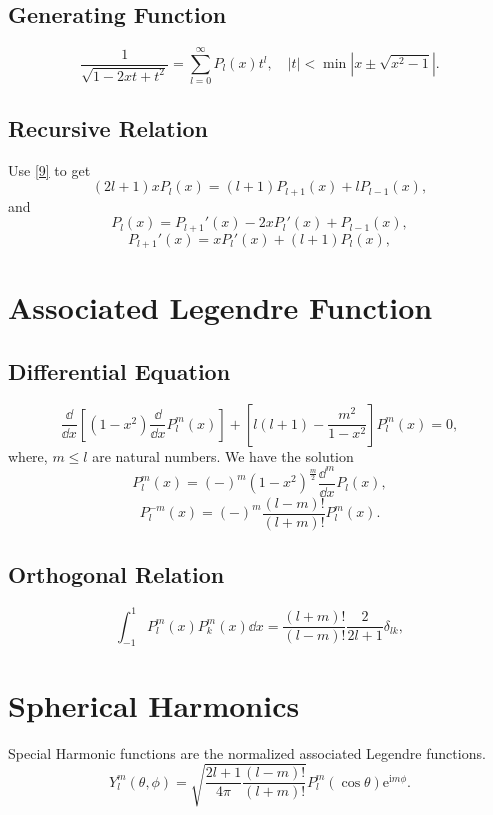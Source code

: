 \documentclass{article}
\theoremstyle{1}
\theoremstyle{2}
\newcommand{\ee}{\mathrm{e}}
\newcommand{\ii}{\mathrm{i}}
\begin{document}
\subsection{Generating Function}
\begin{equation}\label{9}
    \frac{1}{\sqrt{1-2xt+t^2}}=\sum_{l=0}^{\infty}P_l(x)t^l,\quad \left|t\right|<\min\left|x\pm\sqrt{x^2-1}\right|.
\end{equation}
\subsection{Recursive Relation}
Use \eqref{9} to get
\begin{equation}
    (2l+1)xP_l(x)=(l+1)P_{l+1}(x)+lP_{l-1}(x),
\end{equation}
and 
\begin{equation}
    P_{l}(x)=P_{l+1}'(x)-2xP_l'(x)+P_{l-1}(x),
\end{equation}
\begin{equation}
    P_{l+1}'(x)=xP_l'(x)+\left(l+1\right)P_l(x),
\end{equation}


\section{Associated Legendre Function}
\subsection{Differential Equation}
\begin{equation}
    \frac{\dd}{\dd{x}}\left[(1-x^2)\frac{\dd}{\dd{x}}P_l^m(x)\right]+\left[l(l+1)-\frac{m^2}{1-x^2}\right]P_l^m(x)=0,
\end{equation}
where, $m\le l$ are natural numbers. We have the solution
\begin{equation}
    P_l^m(x)=(-)^m(1-x^2)^\frac{m}{2}\frac{\dd^m}{\dd{x}}P_l(x),
\end{equation}
\begin{equation}
    P_l^{-m}(x)=(-)^m\frac{(l-m)!}{(l+m)!}P_l^m(x).
\end{equation}
\subsection{Orthogonal Relation}
\begin{equation}
    \int_{-1}^{1}P_l^m(x)P_k^m(x)\dd{x}=\frac{(l+m)!}{(l-m)!}\frac{2}{2l+1}\delta_{lk},
\end{equation}
\section{Spherical Harmonics}
Special Harmonic functions are the normalized associated Legendre functions.
\begin{equation}
    Y_l^m\left(\theta,\phi\right)=\sqrt{\frac{2l+1}{4\pi}\frac{\left(l-m\right)!}{\left(l+m\right)!}}P_l^m\left(\cos \theta\right) \ee^{\ii m\phi}.
\end{equation}
\end{document}
